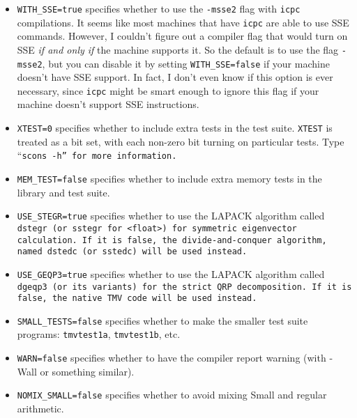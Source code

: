 \begin{enumerate}
\begin{itemize}
dynamic linkage of libraries.  This usually indicates that something is installed incorrectly, but
it can be easier to just use static linkage when you compile as a workaround.  This flag does this
for the test suite executables.  \footnote{Note: combining \texttt{STATIC=true} with \texttt{SHARED=true} does not work.}
\item \texttt{WITH\_SSE=true} specifies whether to use the \texttt{-msse2} flag with \texttt{icpc} compilations. 
It seems like most machines that have \texttt{icpc} are able to use SSE commands.  However, 
I couldn't figure out a compiler flag that would turn on SSE {\em if and only if} the machine
supports it.  So the default is to use the flag \texttt{-msse2}, but you can disable it by setting 
\texttt{WITH\_SSE=false} if your machine doesn't have SSE support.  In fact, I don't even know if this option is ever necessary, since \texttt{icpc} might be smart enough to ignore this flag if your machine doesn't support SSE instructions.
\item \texttt{XTEST=0} specifies whether to include extra tests in the test suite.  \texttt{XTEST}
is treated as a bit set, with each non-zero bit turning on particular tests.  Type ``\tt{scons -h}'' for 
more information.
\item \texttt{MEM\_TEST=false} specifies whether to include extra memory tests in the library and test suite.
\item \texttt{USE\_STEGR=true} specifies whether to use the LAPACK algorithm called
\tt{dstegr} (or \tt{sstegr} for \tt{<float>}) for symmetric
eigenvector calculation.  If it is false, the divide-and-conquer algorithm,
named \tt{dstedc} (or \tt{sstedc}) will be used instead.
\item
\texttt{USE\_GEQP3=true} specifies whether to use the LAPACK algorithm called
\tt{dgeqp3} (or its variants) for the strict QRP decomposition.  If it is false,
the native TMV code will be used instead.
\item \texttt{SMALL\_TESTS=false} specifies whether to make the smaller test suite programs: \texttt{tmvtest1a}, \texttt{tmvtest1b}, etc. 
\item \texttt{WARN=false} specifies whether to have the compiler report warning (with -Wall or
something similar).
\item \texttt{NOMIX\_SMALL=false} specifies whether to avoid mixing Small and regular arithmetic.  

\end{itemize}
\end{enumerate}
